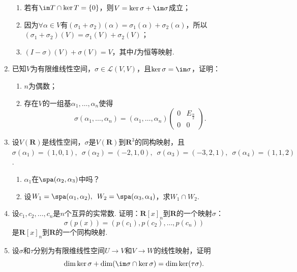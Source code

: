 \begin{enumerate}
\begin{enumerate}
              \item 若有$\im T \cap \ker T = \{0\}$，则$V=\ker\sigma+\im \sigma$成立；

              \item 因为$\forall \alpha \in V$有$(\sigma_1+\sigma_2)(\alpha)=\sigma_1(\alpha)+\sigma_2(\alpha)$，所以$(\sigma_1+\sigma_2)(V)=\sigma_1(V)+\sigma_2(V)$；

              \item $(I-\sigma)(V)+\sigma(V)=V$，其中$I$为恒等映射.
          \end{enumerate}

    \item 已知$V$为有限维线性空间，$\sigma\in \mathcal{L}(V,V)$，且$\ker\sigma=\im \sigma$，证明：
          \begin{enumerate}
              \item $n$为偶数；

              \item 存在$V$的一组基$\alpha_1,\ldots,\alpha_n$使得
                    \[\sigma(\alpha_1,\ldots,\alpha_n)=(\alpha_1,\ldots,\alpha_n)\begin{pmatrix}
                            0 & E_{\frac{n}{2}} \\ 0 & 0
                        \end{pmatrix}.\]
          \end{enumerate}

    \item 设$V(\mathbf{R})$是线性空间，$\sigma$是$V(\mathbf{R})$到$\mathbf{R}^3$的同构映射，且$\sigma(\alpha_1)=(1,0,1),\enspace\allowbreak\sigma(\alpha_2)=(-2,1,0),\enspace\allowbreak\sigma(\alpha_3)=(-3,2,1),\enspace\allowbreak\sigma(\alpha_4)=(1,1,2)$.
          \begin{enumerate}
              \item $\alpha_1$在$\spa(\alpha_2,\alpha_3)$中吗？

              \item 设$W_1=\spa(\alpha_1,\alpha_2),\enspace W_2=\spa(\alpha_3,\alpha_4)$，求$W_1\cap W_2$.
          \end{enumerate}

    \item 设$c_1,c_2,\ldots,c_n$是$n$个互异的实常数. 证明：$\mathbf{R}[x]_n$到$\mathbf{R}$的一个映射$\sigma$：
          \[\sigma(p(x))=(p(c_1),p(c_2),\ldots,p(c_n))\]
          是$\mathbf{R}[x]_n$到$\mathbf{R}$的一个同构映射.

    \item 设$\sigma$和$\tau$分别为有限维线性空间$U\to V$和$V\to W$的线性映射，证明
          \[\dim\ker\sigma+\dim(\im\sigma\cap\ker\sigma)=\dim\ker(\tau\sigma).\]
\end{enumerate}


